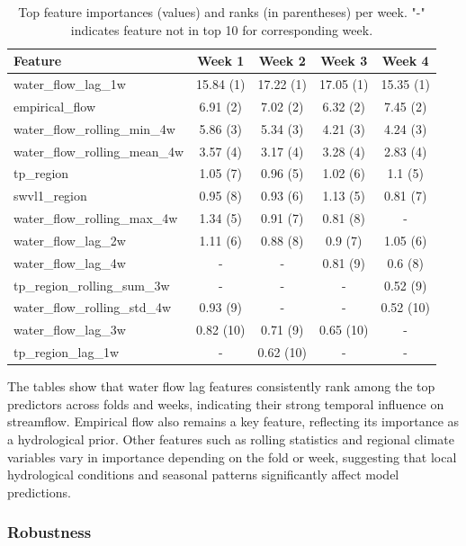 \documentclass[ruler]{CUP-JNL-EDS}%
\begin{document}
\begin{table}[!htp]
\centering
\begin{tabular}{lcccc}
\hline
\textbf{Feature} & \textbf{Week 1} & \textbf{Week 2} & \textbf{Week 3} & \textbf{Week 4} \\ 
\hline
water\_flow\_lag\_1w & 15.84 (1) & 17.22 (1) & 17.05 (1) & 15.35 (1) \\
empirical\_flow & 6.91 (2) & 7.02 (2) & 6.32 (2) & 7.45 (2) \\
water\_flow\_rolling\_min\_4w & 5.86 (3) & 5.34 (3) & 4.21 (3) & 4.24 (3) \\
water\_flow\_rolling\_mean\_4w & 3.57 (4) & 3.17 (4) & 3.28 (4) & 2.83 (4) \\
tp\_region & 1.05 (7) & 0.96 (5) & 1.02 (6) & 1.1 (5) \\
swvl1\_region & 0.95 (8) & 0.93 (6) & 1.13 (5) & 0.81 (7) \\
water\_flow\_rolling\_max\_4w & 1.34 (5) & 0.91 (7) & 0.81 (8) & - \\
water\_flow\_lag\_2w & 1.11 (6) & 0.88 (8) & 0.9 (7) & 1.05 (6) \\
water\_flow\_lag\_4w & - & - & 0.81 (9) & 0.6 (8) \\
tp\_region\_rolling\_sum\_3w & - & - & - & 0.52 (9) \\
water\_flow\_rolling\_std\_4w & 0.93 (9) & - & - & 0.52 (10) \\
water\_flow\_lag\_3w & 0.82 (10) & 0.71 (9) & 0.65 (10) & - \\
tp\_region\_lag\_1w & - & 0.62 (10) & - & - \\
\hline
\end{tabular}
\caption{Top feature importances (values) and ranks (in parentheses) per week. "-" indicates feature not in top 10 for corresponding week.}
\label{tab:feat_importance_ranks_weeks}   
\end{table}
\noindent The tables show that water flow lag features consistently rank among the top predictors across folds and weeks, indicating their strong temporal influence on streamflow. Empirical flow also remains a key feature, reflecting its importance as a hydrological prior. Other features such as rolling statistics and regional climate variables vary in importance depending on the fold or week, suggesting that local hydrological conditions and seasonal patterns significantly affect model predictions.

\subsubsection{Robustness}
\label{sec:robustness}
\end{document}
